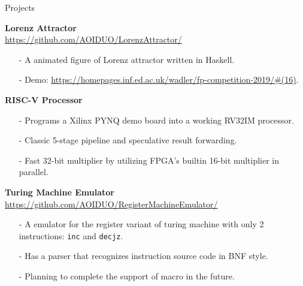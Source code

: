 \documentclass{resume} %
\newcommand{\itemsepval}{-6pt}
\begin{document}
\begin{rSection}{Projects}

    \textbf{Lorenz Attractor} \hfill \\
    \url{https://github.com/AOIDUO/LorenzAttractor/} \hfill \par
    \begin{itemize}
        \itemsep \itemsepval {} 
        \item[-] A animated figure of Lorenz attractor written in Haskell.
        \item[-] Demo: \url{https://homepages.inf.ed.ac.uk/wadler/fp-competition-2019/#(16)}.
    \end{itemize}

    \textbf{RISC-V Processor} \par
    \begin{itemize}
        \itemsep \itemsepval {} 
        \item[-] Programs a Xilinx PYNQ demo board into a working RV32IM processor.
        \item[-] Classic 5-stage pipeline and speculative result forwarding.
        \item[-] Fast 32-bit multiplier by utilizing FPGA's builtin 16-bit multiplier in parallel.
    \end{itemize}

    \textbf{Turing Machine Emulator} \hfill \\ 
    \url{https://github.com/AOIDUO/RegisterMachineEmulator/} \hfill \par
    \begin{itemize}
        \itemsep \itemsepval {} 
        
        \item[-] A emulator for the register variant of turing machine with only 2 instructions: \texttt{inc} and \texttt{decjz}.
        \item[-] Has a parser that recognizes instruction source code in BNF style.
        \item[-] Planning to complete the support of macro in the future.
    \end{itemize}


\end{rSection}
\end{document}
